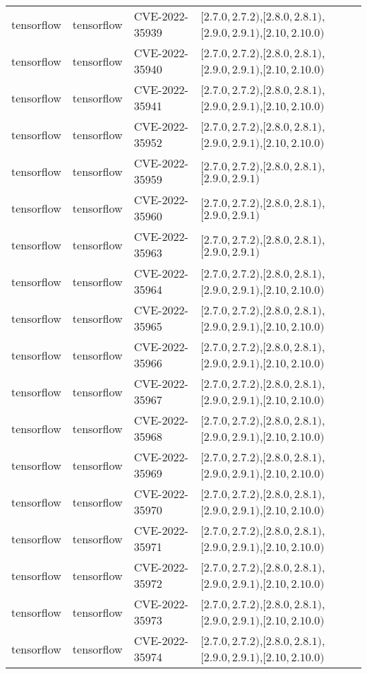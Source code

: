 \begin{tabular}{llll}
tensorflow & tensorflow & CVE-2022-35939 & $[2.7.0,2.7.2)$,$[2.8.0,2.8.1)$,$[2.9.0,2.9.1)$,$[2.10,2.10.0)$ \\
tensorflow & tensorflow & CVE-2022-35940 & $[2.7.0,2.7.2)$,$[2.8.0,2.8.1)$,$[2.9.0,2.9.1)$,$[2.10,2.10.0)$ \\
tensorflow & tensorflow & CVE-2022-35941 & $[2.7.0,2.7.2)$,$[2.8.0,2.8.1)$,$[2.9.0,2.9.1)$,$[2.10,2.10.0)$ \\
tensorflow & tensorflow & CVE-2022-35952 & $[2.7.0,2.7.2)$,$[2.8.0,2.8.1)$,$[2.9.0,2.9.1)$,$[2.10,2.10.0)$ \\
tensorflow & tensorflow & CVE-2022-35959 & $[2.7.0,2.7.2)$,$[2.8.0,2.8.1)$,$[2.9.0,2.9.1)$ \\
tensorflow & tensorflow & CVE-2022-35960 & $[2.7.0,2.7.2)$,$[2.8.0,2.8.1)$,$[2.9.0,2.9.1)$ \\
tensorflow & tensorflow & CVE-2022-35963 & $[2.7.0,2.7.2)$,$[2.8.0,2.8.1)$,$[2.9.0,2.9.1)$ \\
tensorflow & tensorflow & CVE-2022-35964 & $[2.7.0,2.7.2)$,$[2.8.0,2.8.1)$,$[2.9.0,2.9.1)$,$[2.10,2.10.0)$ \\
tensorflow & tensorflow & CVE-2022-35965 & $[2.7.0,2.7.2)$,$[2.8.0,2.8.1)$,$[2.9.0,2.9.1)$,$[2.10,2.10.0)$ \\
tensorflow & tensorflow & CVE-2022-35966 & $[2.7.0,2.7.2)$,$[2.8.0,2.8.1)$,$[2.9.0,2.9.1)$,$[2.10,2.10.0)$ \\
tensorflow & tensorflow & CVE-2022-35967 & $[2.7.0,2.7.2)$,$[2.8.0,2.8.1)$,$[2.9.0,2.9.1)$,$[2.10,2.10.0)$ \\
tensorflow & tensorflow & CVE-2022-35968 & $[2.7.0,2.7.2)$,$[2.8.0,2.8.1)$,$[2.9.0,2.9.1)$,$[2.10,2.10.0)$ \\
tensorflow & tensorflow & CVE-2022-35969 & $[2.7.0,2.7.2)$,$[2.8.0,2.8.1)$,$[2.9.0,2.9.1)$,$[2.10,2.10.0)$ \\
tensorflow & tensorflow & CVE-2022-35970 & $[2.7.0,2.7.2)$,$[2.8.0,2.8.1)$,$[2.9.0,2.9.1)$,$[2.10,2.10.0)$ \\
tensorflow & tensorflow & CVE-2022-35971 & $[2.7.0,2.7.2)$,$[2.8.0,2.8.1)$,$[2.9.0,2.9.1)$,$[2.10,2.10.0)$ \\
tensorflow & tensorflow & CVE-2022-35972 & $[2.7.0,2.7.2)$,$[2.8.0,2.8.1)$,$[2.9.0,2.9.1)$,$[2.10,2.10.0)$ \\
tensorflow & tensorflow & CVE-2022-35973 & $[2.7.0,2.7.2)$,$[2.8.0,2.8.1)$,$[2.9.0,2.9.1)$,$[2.10,2.10.0)$ \\
tensorflow & tensorflow & CVE-2022-35974 & $[2.7.0,2.7.2)$,$[2.8.0,2.8.1)$,$[2.9.0,2.9.1)$,$[2.10,2.10.0)$ \\

\end{tabular}
